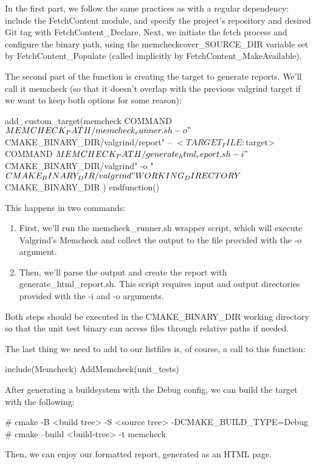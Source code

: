 In the first part, we follow the same practices as with a regular dependency: include the FetchContent module, and specify the project’s repository and desired Git tag with FetchContent\_Declare. Next, we initiate the fetch process and configure the binary path, using the memcheckcover\_SOURCE\_DIR variable set by FetchContent\_Populate (called implicitly by FetchContent\_MakeAvailable).

The second part of the function is creating the target to generate reports. We’ll call it memcheck (so that it doesn’t overlap with the previous valgrind target if we want to keep both options for some reason):


\begin{cmake}
    add_custom_target(memcheck
        COMMAND ${MEMCHECK_PATH}/memcheck_runner.sh -o
            "${CMAKE_BINARY_DIR}/valgrind/report"
            -- $<TARGET_FILE:${target}>
        COMMAND ${MEMCHECK_PATH}/generate_html_report.sh
            -i "${CMAKE_BINARY_DIR}/valgrind"
            -o "${CMAKE_BINARY_DIR}/valgrind"
        WORKING_DIRECTORY ${CMAKE_BINARY_DIR}
    )
endfunction()
\end{cmake}

This happens in two commands:

\begin{enumerate}
\item
First, we’ll run the memcheck\_runner.sh wrapper script, which will execute Valgrind's Memcheck and collect the output to the file provided with the -o argument.

\item
Then, we’ll parse the output and create the report with generate\_html\_report.sh. This script requires input and output directories provided with the -i and -o arguments.
\end{enumerate}

Both steps should be executed in the CMAKE\_BINARY\_DIR working directory so that the unit test binary can access files through relative paths if needed.

The last thing we need to add to our listfiles is, of course, a call to this function:


\begin{cmake}
include(Memcheck)
AddMemcheck(unit_tests)
\end{cmake}

After generating a buildsystem with the Debug config, we can build the target with the following:

\begin{shell}
# cmake -B <build tree> -S <source tree> -DCMAKE_BUILD_TYPE=Debug
# cmake --build <build-tree> -t memcheck
\end{shell}

Then, we can enjoy our formatted report, generated as an HTML page.






